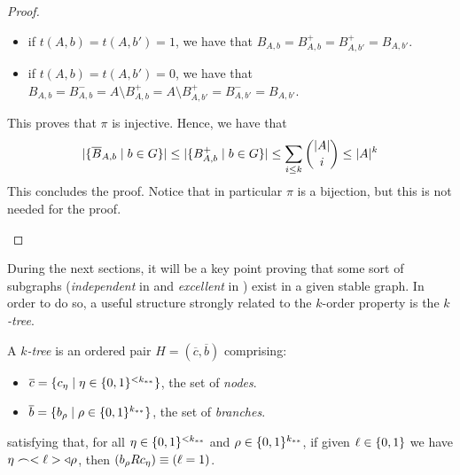 \begin{corollary}[Claim 2.6.1]
\begin{proof}
\begin{enumerate}
                \begin{itemize}
                    \item if $t(A,b) = t(A,b') = 1$, we have that $B_{A,b} = B^+_{A,b} = B^+_{A,b'} = B_{A,b'}$.
                    \item if $t(A,b) = t(A,b') = 0$, we have that
                    $B_{A,b} = B^-_{A,b} = A \setminus B^+_{A,b} = A \setminus B^+_{A,b'} = B^-_{A,b'} = B_{A,b'}$.
                \end{itemize}
                This proves that $\pi$ is injective.
                Hence, we have that
                \[
                    | \{ \overline{B}_{A,b} \mid b \in G \} | \leq
                    | \{ B^+_{A,b} \mid b \in G \} | \leq
                    \sum_{i \leq k} \binom{|A|}{i} \leq |A|^k
                \]
                This concludes the proof.
                Notice that in particular $\pi$ is a bijection, but this is not needed for the proof.
        \end{enumerate}
        \end{proof}
    \end{corollary}

    During the next sections, it will be a key point proving that some sort of  subgraphs
    (\emph{independent} in  and \emph{excellent} in ) exist in a given
    stable graph.
    In order to do so, a useful structure strongly related to the $k$-order property is the \emph{$k$-tree}.

    \begin{definition} \label{def:k-tree}
        A \emph{$k$-tree} is an ordered pair $H = (\overline{c},\overline{b})$ comprising:
        \begin{itemize}
            \item $\overline{c} = \{  c_\eta \mid \eta \in \{ 0,1 \}^{<k_{**}}  \}$, the set of \emph{nodes}.
            \item $\overline{b} = \{  b_\rho \mid \rho \in \{ 0,1 \}^{k_{**}}  \}$, the set of \emph{branches}.
        \end{itemize}
        satisfying that, for all $\eta \in \{ 0,1 \}^{<k_{**}}$ and $\rho \in \{ 0,1 \}^{k_{**}}$,
        if given $\ell \in \{ 0, 1 \}$ we have $\eta \frown < \ell > \triangleleft \rho$, then
        $( b_\rho R c_\eta ) \equiv ( \ell = 1 )$.
    \end{definition}


